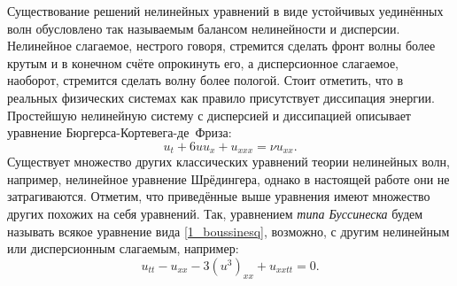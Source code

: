 \documentclass[12pt, a4paper]{report}
\begin{document}
Существование решений нелинейных уравнений в виде устойчивых уединённых волн обусловлено так называемым балансом нелинейности и дисперсии. Нелинейное слагаемое, нестрого говоря, стремится сделать фронт волны более крутым и в конечном счёте опрокинуть его, а дисперсионное слагаемое, наоборот, стремится сделать волну более пологой. 
Стоит отметить, что в реальных физических системах как правило присутствует диссипация энергии. Простейшую нелинейную систему с дисперсией и диссипацией описывает уравнение Бюргерса-Кортевега-де~Фриза:
\begin{equation}\label{1_burgers-kdv}
u_{t} + 6u u_x + u_{xxx} = \nu u_{xx}.
\end{equation}
Существует множество других классических уравнений теории нелинейных волн, например, нелинейное уравнение Шрёдингера, однако в настоящей работе они не затрагиваются. Отметим, что приведённые выше уравнения имеют множество других похожих на себя уравнений. Так, уравнением \emph{типа Буссинеска} будем называть всякое уравнение вида \eqref{1_boussinesq}, возможно, с другим нелинейным или дисперсионным слагаемым, например:
$$
u_{tt} - u_{xx} - 3 (u^3)_{xx} + u_{xxtt} = 0.
$$
\end{document}
